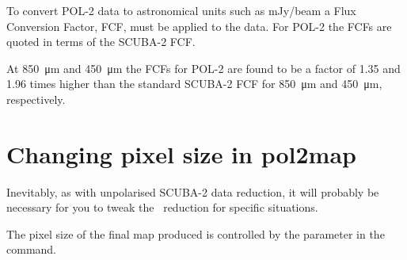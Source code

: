 To convert POL-2 data to astronomical units such as mJy/beam a Flux Conversion 
Factor, FCF, must be applied to the data. For POL-2 the FCFs are quoted in terms of
the SCUBA-2 FCF.

At \SI{850}{\micro\metre} and \SI{450}{\micro\metre} the FCFs for POL-2
are found to be a factor of 1.35 and 1.96 times higher than the
standard SCUBA-2 FCF for \SI{850}{\micro\metre} and \SI{450}{\micro\metre}, respectively.


\section{Changing pixel size in pol2map}
\label{sec:pol2map-pixelsize}

Inevitably, as with unpolarised SCUBA-2 data reduction, it will
probably be necessary for you to tweak the \poltwomap\ reduction for
specific situations.

The pixel size of the final map produced is controlled by the 
parameter in the \SMURF\  command.

\begin{terminalv}
\end{terminalv}








